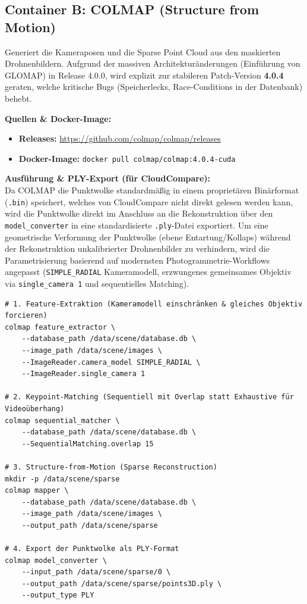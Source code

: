 \documentclass[12pt,a4paper]{article}
\begin{document}
\subsection*{Container B: COLMAP (Structure from Motion)}
Generiert die Kameraposen und die Sparse Point Cloud aus den maskierten Drohnenbildern.
Aufgrund der massiven Architekturänderungen (Einführung von GLOMAP) in Release 4.0.0, wird explizit zur stabileren Patch-Version \textbf{4.0.4} geraten, welche kritische Bugs (Speicherlecks, Race-Conditions in der Datenbank) behebt.

\textbf{Quellen \& Docker-Image:}
\begin{itemize}[noitemsep]
    \item \textbf{Releases:} \url{https://github.com/colmap/colmap/releases}
    \item \textbf{Docker-Image:} \texttt{docker pull colmap/colmap:4.0.4-cuda}
\end{itemize}

\textbf{Ausführung \& PLY-Export (für CloudCompare):}\\
Da COLMAP die Punktwolke standardmäßig in einem proprietären Binärformat (\texttt{.bin}) speichert, welches von CloudCompare nicht direkt gelesen werden kann, wird die Punktwolke direkt im Anschluss an die Rekonstruktion über den \texttt{model\_converter} in eine standardisierte \texttt{.ply}-Datei exportiert. Um eine geometrische Verformung der Punktwolke (ebene Entartung/Kollaps) während der Rekonstruktion unkalibrierter Drohnenbilder zu verhindern, wird die Parametrisierung basierend auf modernsten Photogrammetrie-Workflows angepasst (\texttt{SIMPLE\_RADIAL} Kameramodell, erzwungenes gemeinsames Objektiv via \texttt{single\_camera 1} und sequentielles Matching).

\begin{verbatim}
# 1. Feature-Extraktion (Kameramodell einschränken & gleiches Objektiv forcieren)
colmap feature_extractor \
    --database_path /data/scene/database.db \
    --image_path /data/scene/images \
    --ImageReader.camera_model SIMPLE_RADIAL \
    --ImageReader.single_camera 1

# 2. Keypoint-Matching (Sequentiell mit Overlap statt Exhaustive für Videoüberhang)
colmap sequential_matcher \
    --database_path /data/scene/database.db \
    --SequentialMatching.overlap 15

# 3. Structure-from-Motion (Sparse Reconstruction)
mkdir -p /data/scene/sparse
colmap mapper \
    --database_path /data/scene/database.db \
    --image_path /data/scene/images \
    --output_path /data/scene/sparse

# 4. Export der Punktwolke als PLY-Format
colmap model_converter \
    --input_path /data/scene/sparse/0 \
    --output_path /data/scene/sparse/points3D.ply \
    --output_type PLY
\end{verbatim}
\end{document}
